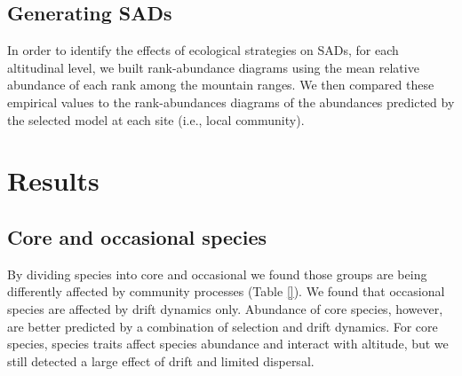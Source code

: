 \documentclass[12pt]{article}
\begin{document}
\subsection*{Generating SADs}

In order to identify the effects of ecological strategies on SADs, for each altitudinal level, we built rank-abundance diagrams using the mean relative abundance of each rank among the mountain ranges. We then compared these empirical
values to the rank-abundances diagrams of the abundances predicted by the selected model at each site (i.e., local community). 

\section*{Results}

\subsection*{Core and occasional species}

By dividing species into core and occasional we found those groups are being differently affected by community processes (Table \ref{}). We found that occasional species are affected by drift dynamics only. Abundance of core species, however, are better predicted by a combination of selection and drift dynamics. For core species, species traits affect species abundance and interact with altitude, but
we still detected a large effect of drift and limited dispersal.


\end{document}
